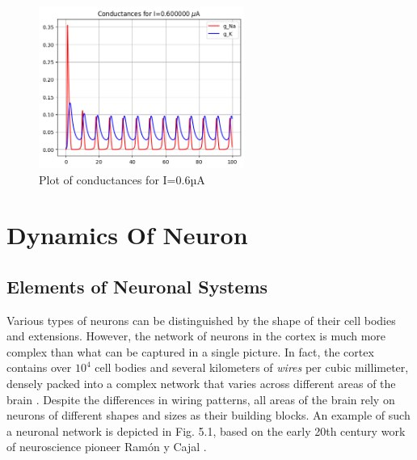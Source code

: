 \documentclass[12pt,a4paper]{report}
\begin{document}
\begin{figure}[H]
    \centering
    \includegraphics[width=0.6\textwidth]{./data/conductances_0_6uA.png}
    \caption{Plot of conductances for I=0.6µA}
    \label{fig:conductances_0_6uA}
\end{figure}


\chapter{Dynamics Of Neuron}

\section{Elements of Neuronal Systems}

Various types of neurons can be distinguished by the shape of their cell bodies and extensions. However, the network of neurons in the cortex is much more complex than what can be captured in a single picture. In fact, the cortex contains over \(10^{4}\) cell bodies and several kilometers of \textit{wires} per cubic millimeter, densely packed into a complex network that varies across different areas of the brain \cite{ref1}. Despite the differences in wiring patterns, all areas of the brain rely on neurons of different shapes and sizes as their building blocks. An example of such a neuronal network is depicted in Fig. 5.1, based on the early 20th century work of neuroscience pioneer Ramón y Cajal \cite{ref1}.
\end{document}
